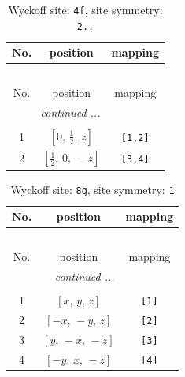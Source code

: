 \documentclass[fleqn,8pt]{jsarticle}
\begin{document}
\renewcommand{\arraystretch}{1.2}
\begin{longtable}{ccc}
\caption{Wyckoff site: {\tt 4f}, site symmetry: {\tt 2..}}
 \\
 \hline \hline
No. & position & mapping \\ \hline \endfirsthead

\multicolumn{2}{l}{\tablename\ \thetable{}} \\
 \hline \hline
No. & position & mapping \\ \hline \endhead

 \hline \hline
\multicolumn{2}{r}{\footnotesize\it continued ...} \\ \endfoot

 \hline \hline
\multicolumn{2}{r}{} \\ \endlastfoot

1 & $\left[ 0,\, \frac{1}{2},\, z \right]$ & {\tt [1,2]} \\ \hline
2 & $\left[ \frac{1}{2},\, 0,\, - z \right]$ & {\tt [3,4]} \\
\end{longtable}
\renewcommand{\arraystretch}{1.2}
\begin{longtable}{ccc}
\caption{Wyckoff site: {\tt 8g}, site symmetry: {\tt 1}}
 \\
 \hline \hline
No. & position & mapping \\ \hline \endfirsthead

\multicolumn{2}{l}{\tablename\ \thetable{}} \\
 \hline \hline
No. & position & mapping \\ \hline \endhead

 \hline \hline
\multicolumn{2}{r}{\footnotesize\it continued ...} \\ \endfoot

 \hline \hline
\multicolumn{2}{r}{} \\ \endlastfoot

1 & $\left[ x,\, y,\, z \right]$ & {\tt [1]} \\ \hline
2 & $\left[ - x,\, - y,\, z \right]$ & {\tt [2]} \\ \hline
3 & $\left[ y,\, - x,\, - z \right]$ & {\tt [3]} \\ \hline
4 & $\left[ - y,\, x,\, - z \right]$ & {\tt [4]} \\
\end{longtable}
\end{document}
